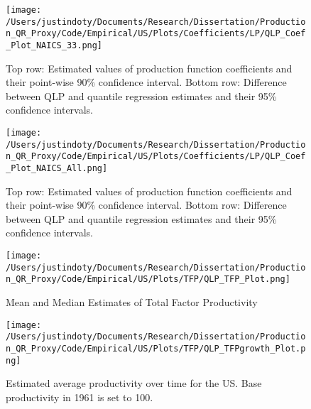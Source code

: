 \documentclass[11pt]{article}
\begin{document}
\begin{figure}[H]
\centering
\texttt{[image: /Users/justindoty/Documents/Research/Dissertation/Production\_QR\_Proxy/Code/Empirical/US/Plots/Coefficients/LP/QLP\_Coef\_Plot\_NAICS\_33.png]}
\caption{Top row: Estimated values of production function coefficients and their point-wise 90\% confidence interval. Bottom row: Difference between QLP and quantile regression estimates and their 95\% confidence intervals.}
\label{fig:33coef}
\end{figure}

\begin{figure}[H]
\centering
\texttt{[image: /Users/justindoty/Documents/Research/Dissertation/Production\_QR\_Proxy/Code/Empirical/US/Plots/Coefficients/LP/QLP\_Coef\_Plot\_NAICS\_All.png]}
\caption{Top row: Estimated values of production function coefficients and their point-wise 90\% confidence interval. Bottom row: Difference between QLP and quantile regression estimates and their 95\% confidence intervals.}
\label{fig:USallcoef}
\end{figure}

\begin{figure}[H]
\centering
\caption{Mean and Median Estimates of Total Factor Productivity}
\texttt{[image: /Users/justindoty/Documents/Research/Dissertation/Production\_QR\_Proxy/Code/Empirical/US/Plots/TFP/QLP\_TFP\_Plot.png]}
\label{fig:LPUSTFPDens}
\end{figure}

\begin{figure}[H]
\centering
\texttt{[image: /Users/justindoty/Documents/Research/Dissertation/Production\_QR\_Proxy/Code/Empirical/US/Plots/TFP/QLP\_TFPgrowth\_Plot.png]}
\caption{Estimated average productivity over time for the US. Base productivity in 1961 is set to 100.}
\label{fig:USpgrowth}
\end{figure}
\end{document}
